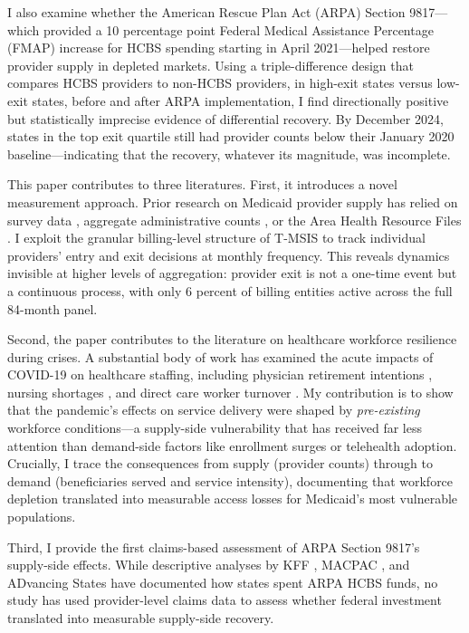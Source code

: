 \documentclass[12pt]{article}
\begin{document}
I also examine whether the American Rescue Plan Act (ARPA) Section 9817---which provided a 10 percentage point Federal Medical Assistance Percentage (FMAP) increase for HCBS spending starting in April 2021---helped restore provider supply in depleted markets. Using a triple-difference design that compares HCBS providers to non-HCBS providers, in high-exit states versus low-exit states, before and after ARPA implementation, I find directionally positive but statistically imprecise evidence of differential recovery. By December 2024, states in the top exit quartile still had provider counts below their January 2020 baseline---indicating that the recovery, whatever its magnitude, was incomplete.

This paper contributes to three literatures. First, it introduces a novel measurement approach. Prior research on Medicaid provider supply has relied on survey data \citep{kff2022hcbs}, aggregate administrative counts \citep{macpac2023hcbs}, or the Area Health Resource Files \citep{hrsa2023ahrf}. I exploit the granular billing-level structure of T-MSIS to track individual providers' entry and exit decisions at monthly frequency. This reveals dynamics invisible at higher levels of aggregation: provider exit is not a one-time event but a continuous process, with only 6 percent of billing entities active across the full 84-month panel.

Second, the paper contributes to the literature on healthcare workforce resilience during crises. A substantial body of work has examined the acute impacts of COVID-19 on healthcare staffing, including physician retirement intentions \citep{sinsky2021covid}, nursing shortages \citep{auerbach2022nurse}, and direct care worker turnover \citep{scales2020hcbs}. My contribution is to show that the pandemic's effects on service delivery were shaped by \emph{pre-existing} workforce conditions---a supply-side vulnerability that has received far less attention than demand-side factors like enrollment surges or telehealth adoption. Crucially, I trace the consequences from supply (provider counts) through to demand (beneficiaries served and service intensity), documenting that workforce depletion translated into measurable access losses for Medicaid's most vulnerable populations.

Third, I provide the first claims-based assessment of ARPA Section 9817's supply-side effects. While descriptive analyses by KFF \citep{kff2024arpa}, MACPAC \citep{macpac2024arpa}, and ADvancing States \citep{advancingstates2024} have documented how states spent ARPA HCBS funds, no study has used provider-level claims data to assess whether federal investment translated into measurable supply-side recovery.
\end{document}
